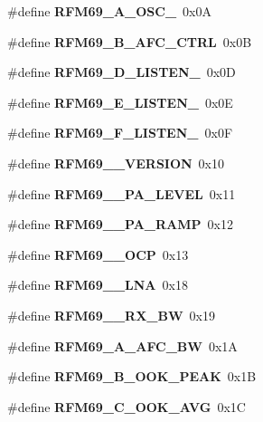 \begin{DoxyCompactItemize}
\item 
\mbox{\label{_r_f_m69__registri_8h_a7bcd33a6e8f13b7f2efdc01dbff25b21}} 
\#define {\bfseries R\+F\+M69\+\_\+A\+\_\+\+O\+S\+C\+\_}~0x0A
\item 
\mbox{\label{_r_f_m69__registri_8h_af0c648c6ee7c18280445ffad62980a4f}} 
\#define {\bfseries R\+F\+M69\+\_\+B\+\_\+\+A\+F\+C\+\_\+\+C\+T\+RL}~0x0B
\item 
\mbox{\label{_r_f_m69__registri_8h_a2f9cad662d4007b2e4ba5b8658d9b6f4}} 
\#define {\bfseries R\+F\+M69\+\_\+D\+\_\+\+L\+I\+S\+T\+E\+N\+\_}~0x0D
\item 
\mbox{\label{_r_f_m69__registri_8h_aabe42fe77d38ba304034cbbc1aecd4f7}} 
\#define {\bfseries R\+F\+M69\+\_\+E\+\_\+\+L\+I\+S\+T\+E\+N\+\_}~0x0E
\item 
\mbox{\label{_r_f_m69__registri_8h_a625c0d3534a658be413a401fd2707393}} 
\#define {\bfseries R\+F\+M69\+\_\+F\+\_\+\+L\+I\+S\+T\+E\+N\+\_}~0x0F
\item 
\mbox{\label{_r_f_m69__registri_8h_adfa02d15184bc76e70aebd8a8a0aefa9}} 
\#define {\bfseries R\+F\+M69\+\_\+\_\+\+V\+E\+R\+S\+I\+ON}~0x10
\item 
\mbox{\label{_r_f_m69__registri_8h_a18277b518a053a62adf370ac31696d9d}} 
\#define {\bfseries R\+F\+M69\+\_\+\_\+\+P\+A\+\_\+\+L\+E\+V\+EL}~0x11
\item 
\mbox{\label{_r_f_m69__registri_8h_a359be3fc7ed403ee04bf5e210a3c33d7}} 
\#define {\bfseries R\+F\+M69\+\_\+\_\+\+P\+A\+\_\+\+R\+A\+MP}~0x12
\item 
\mbox{\label{_r_f_m69__registri_8h_a4fa6043fbb3fb82b6417ba40bc9bcc34}} 
\#define {\bfseries R\+F\+M69\+\_\+\_\+\+O\+CP}~0x13
\item 
\mbox{\label{_r_f_m69__registri_8h_a211f841c70f60ec96901d05d6adcd303}} 
\#define {\bfseries R\+F\+M69\+\_\+\_\+\+L\+NA}~0x18
\item 
\mbox{\label{_r_f_m69__registri_8h_adf1c1ce55b1a8960c47d5aa7f87509a2}} 
\#define {\bfseries R\+F\+M69\+\_\+\_\+\+R\+X\+\_\+\+BW}~0x19
\item 
\mbox{\label{_r_f_m69__registri_8h_a0430e4c98f1674c40fca989c86ef1ac3}} 
\#define {\bfseries R\+F\+M69\+\_\+A\+\_\+\+A\+F\+C\+\_\+\+BW}~0x1A
\item 
\mbox{\label{_r_f_m69__registri_8h_ac58a20cfcbda739efee8c45eb8b982ca}} 
\#define {\bfseries R\+F\+M69\+\_\+B\+\_\+\+O\+O\+K\+\_\+\+P\+E\+AK}~0x1B
\item 
\mbox{\label{_r_f_m69__registri_8h_ac6c0fc701e0d490d49a27ba609a8173e}} 
\#define {\bfseries R\+F\+M69\+\_\+C\+\_\+\+O\+O\+K\+\_\+\+A\+VG}~0x1C

\end{DoxyCompactItemize}
